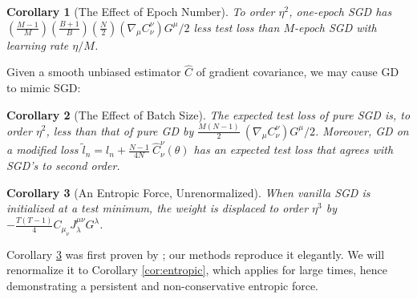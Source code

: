 \documentclass{article}
\theoremstyle{plain}
\newtheorem{cor}{Corollary}
\theoremstyle{definition}
\newcommand{\wrap}[1]{\left(#1\right)}
\newcommand{\sdia}[1]{\begin{gathered}\texttt{[image: ../diagrams/\#1.png]}\end{gathered}}
\begin{document}
        \begin{cor}[The Effect of Epoch Number] \label{cor:epochs}
            To order $\eta^2$, one-epoch SGD has 
            $
                 \wrap{\frac{M-1}{M}}\wrap{\frac{B+1}{B}}\wrap{\frac{N}{2}}
                 \wrap{\nabla_\mu C^{\nu}_{\nu}} G^\mu / 2
            $
            less test loss than $M$-epoch SGD with learning rate $\eta/M$.
        \end{cor}
    
        Given a smooth unbiased estimator $\hat{C}$ of gradient covariance, we
        may cause GD to mimic SGD:
        \begin{cor}[The Effect of Batch Size] \label{cor:batch}
            The expected test loss of pure SGD is, to order $\eta^2$,
            less than that of pure GD by
            $
                  \frac{M(N-1)}{2} ~
                  \wrap{\nabla_\mu C^{\nu}_{\nu}} G^\mu / 2
            $.
            Moreover, GD on a modified loss 
            $
                \tilde l_n = l_n +
                    \frac{N-1}{4N} ~
                    \hat{C}_\nu^\nu(\theta)
            $
            has an expected test loss that agrees with SGD's to second order.
        \end{cor}
    
        \begin{cor}[An Entropic Force, Unrenormalized] \label{cor:noncons}
            When vanilla SGD is initialized at a test minimum, the weight is
            displaced to order $\eta^3$ by 
            $
                -\frac{T(T-1)}{4} C_{\mu_\nu} J^{\mu \nu}_{\lambda} G^{\lambda}
            $.
        \end{cor}
        Corollary \ref{cor:noncons} was first proven by \citet{ya19b}; our
        methods reproduce it elegantly.  We will renormalize it to Corollary
        \ref{cor:entropic}, which applies for large times, hence demonstrating
        a persistent and non-conservative entropic force.
    
\end{document}
